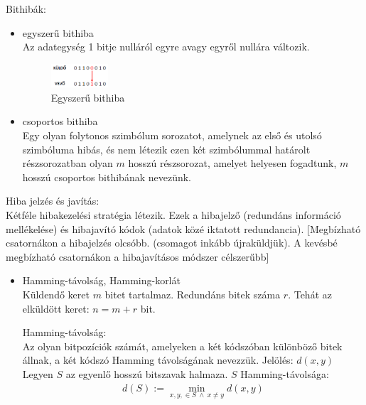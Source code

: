\documentclass[margin=0px]{article}
\begin{document}
\begin{description}
        Bithibák:
        \begin{itemize}
            \item egyszerű bithiba \\
                  Az adategység 1 bitje nulláról egyre avagy egyről nullára változik.
                  \begin{figure}[H]
                      \centering
                      \includegraphics[width=0.2\textwidth]{img/egyszeru_bithiba.png}
                      \caption{Egyszerű bithiba}
                  \end{figure}
            \item csoportos bithiba \\
                  Egy olyan folytonos szimbólum sorozatot, amelynek az első és utolsó szimbóluma hibás, és nem létezik ezen két szimbólummal határolt részsorozatban olyan $m$ hosszú részsorozat, amelyet helyesen fogadtunk, $m$ hosszú csoportos bithibának nevezünk.
        \end{itemize}

        Hiba jelzés és javítás:\\
        Kétféle hibakezelési stratégia létezik. Ezek a hibajelző (redundáns információ mellékelése) és hibajavító kódok (adatok közé iktatott redundancia).
            [Megbízható csatornákon a hibajelzés olcsóbb. (csomagot inkább újraküldjük). A kevésbé megbízható csatornákon a hibajavításos módszer célszerűbb]
        \begin{itemize}
            \item Hamming-távolság, Hamming-korlát \\
                  Küldendő keret $m$ bitet tartalmaz. Redundáns bitek száma $r$. Tehát az elküldött keret: $n = m+r$ bit.

                  Hamming-távolság: \\
                  Az olyan bitpozíciók számát, amelyeken a két kódszóban különböző bitek állnak, a két kódszó Hamming távolságának nevezzük. Jelölés: $d(x,y)$\\
                  Legyen $S$ az egyenlő hosszú bitszavak halmaza. $S$ Hamming-távolsága:
                  \begin{align*}
                      d(S) := \min_{x,y, \in S \ \land \ x \neq y} d(x,y)
                  \end{align*}


\end{itemize}
\end{description}
\end{document}
